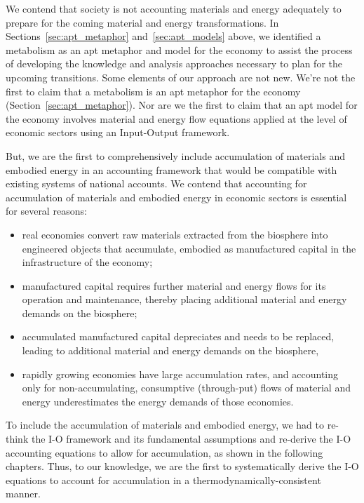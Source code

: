 We contend that society is not accounting materials and energy adequately 
to prepare for the coming material and energy transformations.
In Sections~\ref{sec:apt_metaphor} and~\ref{sec:apt_models} above,
we identified a metabolism as an apt metaphor and model for the economy 
to assist the process of developing the knowledge and analysis approaches
necessary to plan for the upcoming transitions.
Some elements of our approach are not new.
We're not the first to claim that a metabolism is an apt metaphor for the economy
(Section~\ref{sec:apt_metaphor}).\cite{F-K1998, Giampietro2000, Barradas1936, Haberl2001, Daniels2001}
Nor are we the first to claim that an apt model for the economy 
involves material and energy flow equations 
applied at the level of economic sectors using an Input-Output framework.~\cite{G-R1975,
G-R1979a, Lenzen1998, Hendrickson2006}

But, we are the first to comprehensively include accumulation
of materials and embodied energy in an accounting framework
that would be compatible with existing systems of national accounts.
We contend that accounting for accumulation 
of materials and embodied energy in economic sectors is essential
for several reasons:

\begin{itemize}
	\item{real economies convert raw materials extracted from the biosphere
		 	into engineered objects that accumulate,  
			embodied as manufactured capital in the infrastructure of the economy;}
	\item{manufactured capital requires further material and energy flows
			for its operation and maintenance,
			thereby placing additional material and energy demands on the biosphere;}
	\item{accumulated manufactured capital depreciates and needs to be replaced,
		 	leading to additional material and energy demands on the biosphere,}
	\item{rapidly growing economies have large accumulation rates, 
			and accounting only for non-accumulating,
			consumptive (through-put) flows of material and energy 
			underestimates the energy demands of those economies.}
\end{itemize}

To include the accumulation of materials and embodied energy, 
we had to re-think the I-O framework and its fundamental assumptions
and re-derive the I-O accounting equations
to allow for accumulation, as shown in the following chapters. 
Thus, to our knowledge, we are the first 
to systematically derive the I-O equations to account for accumulation
in a thermodynamically-consistent manner.


